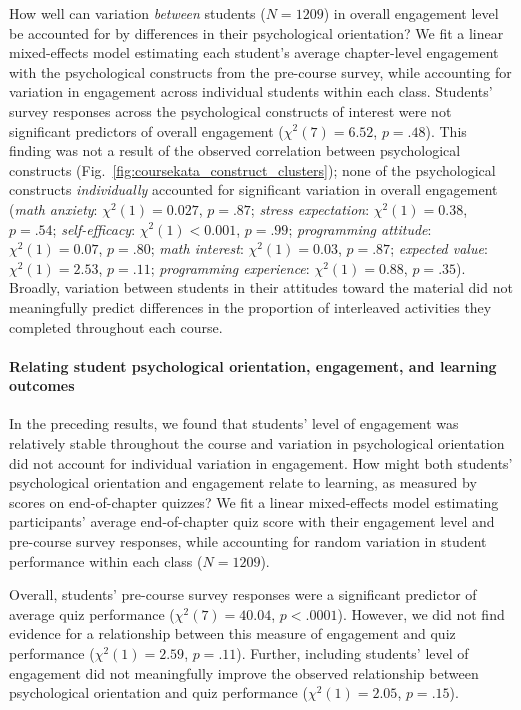 \documentclass[10pt,letterpaper]{article}
\begin{document}
How well can variation \textit{between} students ($N=1209$) in overall engagement level be accounted for by differences in their psychological orientation? 
We fit a linear mixed-effects model estimating each student's average chapter-level engagement with the psychological constructs from the pre-course survey, while accounting for variation in engagement across individual students within each class. 
Students' survey responses across the psychological constructs of interest were not significant predictors of overall engagement ($\chi^2(7)=6.52$, $p=.48$).
This finding was not a result of the observed correlation between psychological constructs (Fig.~\ref{fig:coursekata_construct_clusters}); none of the psychological constructs \textit{individually} accounted for significant variation in overall engagement (\textit{math anxiety}: $\chi^2(1)=0.027$, $p=.87$; \textit{stress expectation}: $\chi^2(1)=0.38$, $p=.54$; \textit{self-efficacy}: $\chi^2(1)<0.001$, $p=.99$; \textit{programming attitude}: $\chi^2(1)=0.07$, $p=.80$; \textit{math interest}: $\chi^2(1)=0.03$, $p=.87$; \textit{expected value}: $\chi^2(1)=2.53$, $p=.11$; \textit{programming experience}: $\chi^2(1)=0.88$, $p=.35$).
Broadly, variation between students in their attitudes toward the material did not meaningfully predict differences in the proportion of interleaved activities they completed throughout each course.

\paragraph{Relating student psychological orientation, engagement, and learning outcomes}

In the preceding results, we found that students' level of engagement was relatively stable throughout the course and variation in psychological orientation did not account for individual variation in engagement.
How might both students' psychological orientation and engagement relate to learning, as measured by scores on end-of-chapter quizzes?
We fit a linear mixed-effects model estimating participants' average end-of-chapter quiz score with their engagement level and pre-course survey responses, while accounting for random variation in student performance within each class ($N=1209$). 

Overall, students' pre-course survey responses were a significant predictor of average quiz performance ($\chi^2(7)=40.04$, $p<.0001$). 
However, we did not find evidence for a relationship between this measure of engagement and quiz performance ($\chi^2(1)=2.59$, $p=.11$). 
Further, including students' level of engagement did not meaningfully improve the observed relationship between psychological orientation and quiz performance ($\chi^2(1)=2.05$, $p=.15$). 
\end{document}
